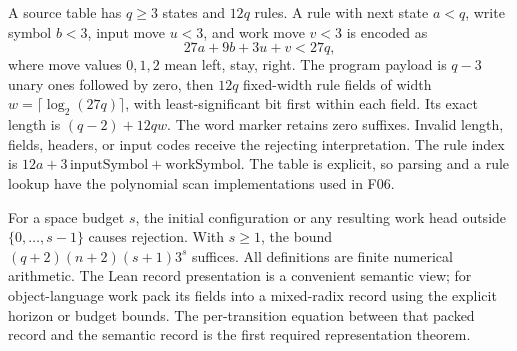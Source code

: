 A source table has $q\ge3$ states and $12q$ rules. A rule with next state $a<q$, write symbol $b<3$, input move $u<3$, and work move $v<3$ is encoded as
\[
 27a+9b+3u+v<27q,
\]
where move values $0,1,2$ mean left, stay, right. The program payload is $q-3$ unary ones followed by zero, then $12q$ fixed-width rule fields of width $w=\lceil\log_2(27q)\rceil$, with least-significant bit first within each field. Its exact length is $(q-2)+12qw$. The word marker retains zero suffixes. Invalid length, fields, headers, or input codes receive the rejecting interpretation. The rule index is $12a+3\,\text{inputSymbol}+\text{workSymbol}$. The table is explicit, so parsing and a rule lookup have the polynomial scan implementations used in F06.

For a space budget $s$, the initial configuration or any resulting work head outside $\{0,\ldots,s-1\}$ causes rejection. With $s\ge1$, the bound $(q+2)(n+2)(s+1)3^s$ suffices. All definitions are finite numerical arithmetic. The Lean record presentation is a convenient semantic view; for object-language work pack its fields into a mixed-radix record using the explicit horizon or budget bounds. The per-transition equation between that packed record and the semantic record is the first required representation theorem.

